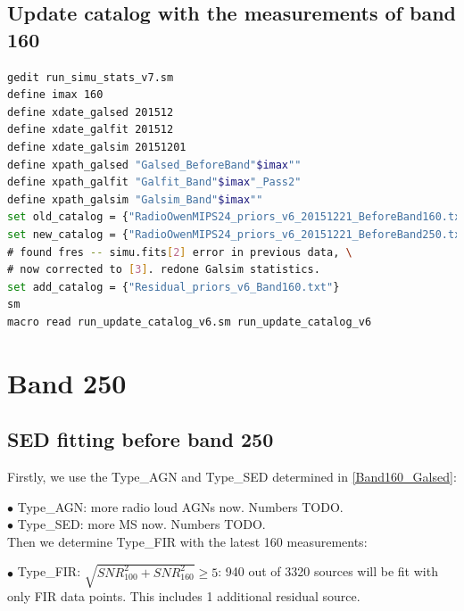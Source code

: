 \documentclass[11pt,a4paper]{article}
\begin{document}
\subsection{Update catalog with the measurements of band 160}

\begin{lstlisting}[language=bash]
gedit run_simu_stats_v7.sm
define imax 160
define xdate_galsed 201512
define xdate_galfit 201512
define xdate_galsim 20151201
define xpath_galsed "Galsed_BeforeBand"$imax""
define xpath_galfit "Galfit_Band"$imax"_Pass2"
define xpath_galsim "Galsim_Band"$imax""
set old_catalog = {"RadioOwenMIPS24_priors_v6_20151221_BeforeBand160.txt"}
set new_catalog = {"RadioOwenMIPS24_priors_v6_20151221_BeforeBand250.txt"} \
# found fres -- simu.fits[2] error in previous data, \
# now corrected to [3]. redone Galsim statistics. 
set add_catalog = {"Residual_priors_v6_Band160.txt"}
sm
macro read run_update_catalog_v6.sm run_update_catalog_v6
\end{lstlisting}


\clearpage

\section{Band 250}

\subsection{SED fitting before band 250}
\label{Band250_Galsed}

Firstly, we use the Type\_AGN and Type\_SED determined in \ref{Band160_Galsed}:

\indent\hspace{15pt}$\bullet$ 
Type\_AGN: more radio loud AGNs now. Numbers TODO. 
\\
\indent\hspace{15pt}$\bullet$ 
Type\_SED: more MS now. Numbers TODO. 
\\

Then we determine Type\_FIR with the latest 160 measurements:

\indent\hspace{15pt}$\bullet$ 
Type\_FIR: $\sqrt{SNR_{100}^2+SNR_{160}^2} \ge 5$: 940 out of 3320 sources will be fit with only FIR data points. This includes 1 additional residual source. 
\\
\end{document}

